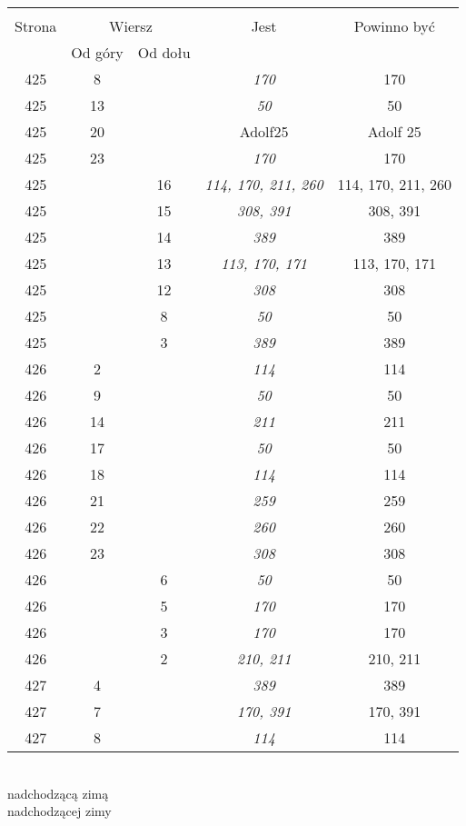 \documentclass[a4paper,11pt]{article}
\begin{document}
\begin{center}
  \begin{tabular}{|c|c|c|c|c|}
    \hline
    & \multicolumn{2}{c|}{} & & \\
    Strona & \multicolumn{2}{c|}{Wiersz}& Jest & Powinno być \\ \cline{2-3}
    & Od góry & Od dołu &  &  \\ \hline
    425 &  8 & & \emph{170} & 170 \\
    425 & 13 & & \emph{50}  & 50 \\
    425 & 20 & & Adolf25 & Adolf 25 \\
    425 & 23 & & \emph{170} & 170 \\
    425 & & 16 & \emph{114, 170, 211, 260} & 114, 170, 211, 260 \\
    425 & & 15 & \emph{308, 391} & 308, 391 \\
    425 & & 14 & \emph{389} & 389 \\
    425 & & 13 & \emph{113, 170, 171} & 113, 170, 171 \\
    425 & & 12 & \emph{308} & 308 \\
    425 & &  8 & \emph{50}  &  50 \\
    425 & &  3 & \emph{389} & 389 \\
    426 &  2 & & \emph{114} & 114 \\
    426 &  9 & & \emph{50}  &  50 \\
    426 & 14 & & \emph{211} & 211 \\
    426 & 17 & & \emph{50}  &  50 \\
    426 & 18 & & \emph{114} & 114 \\
    426 & 21 & & \emph{259} & 259 \\
    426 & 22 & & \emph{260} & 260 \\
    426 & 23 & & \emph{308} & 308 \\
    426 & &  6 & \emph{50}  &  50 \\
    426 & &  5 & \emph{170} & 170 \\
    426 & &  3 & \emph{170} & 170 \\
    426 & &  2 & \emph{210, 211} & 210, 211 \\
    427 &  4 & & \emph{389} & 389 \\
    427 &  7 & & \emph{170, 391} & 170, 391 \\
    427 &  8 & & \emph{114} & 114 \\
    \hline
  \end{tabular}
\end{center}
\noi
{} \\
\Jest nadchodzącą zimą \\
\Pow  nadchodzącej zimy \\
\end{document}
